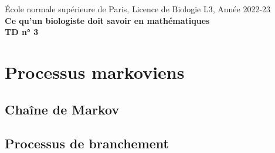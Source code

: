 \documentclass[french, 12pt]{article}
\numberwithin{exercise}{section}
\numberwithin{equation}{section}
\begin{document}

\begin{center}
  \small{\sc \'Ecole normale supérieure de Paris, Licence de Biologie L3, Année 2022-23} \\
  \bigskip
  \large{\bf Ce qu'un biologiste doit savoir en mathématiques} \\
  \bigskip  
  {\bf TD n° 3}
\end{center}

\section{Processus markoviens} 
\newcommand{\probas}{/home/robin/ENSEIGN/Cours/MathBiologie/L3-ENS-Math1/Exercices/Probas}

\subsection{Chaîne de Markov}



\subsection{Processus de branchement}





\end{document}
